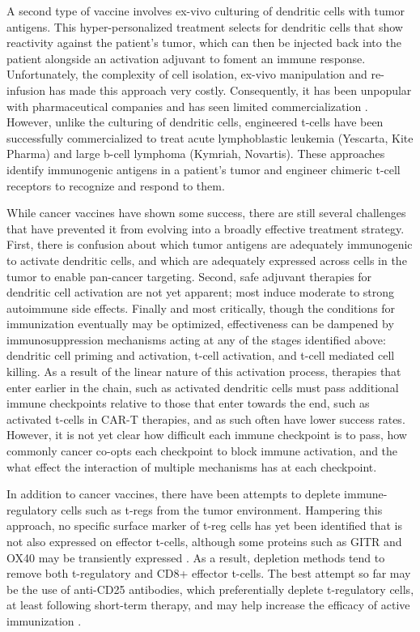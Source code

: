 A second type of vaccine involves ex-vivo culturing of dendritic cells with tumor antigens. 
This hyper-personalized treatment selects for dendritic cells that show reactivity against the patient’s tumor, which can then be injected back into the patient alongside an activation adjuvant to foment an immune response. 
Unfortunately, the complexity of cell isolation, ex-vivo manipulation and re-infusion has made this approach very costly. 
Consequently, it has been unpopular with pharmaceutical companies and has seen limited commercialization \citep{Mellman2011}.
However, unlike the culturing of dendritic cells, engineered t-cells have been successfully commercialized to treat acute lymphoblastic leukemia (Yescarta, Kite Pharma) and large b-cell lymphoma (Kymriah, Novartis).
These approaches identify immunogenic antigens in a patient’s tumor and engineer chimeric t-cell receptors to recognize and respond to them.  

While cancer vaccines have shown some success, there are still several challenges that have prevented it from evolving into a broadly effective treatment strategy. 
First, there is confusion about which tumor antigens are adequately immunogenic to activate dendritic cells, and which are adequately expressed across cells in the tumor to enable pan-cancer targeting.
Second, safe adjuvant therapies for dendritic cell activation are not yet apparent; most induce moderate to strong autoimmune side effects. 
Finally and most critically, though the conditions for immunization eventually may be optimized, effectiveness can be dampened by immunosuppression mechanisms acting at any of the stages identified above: dendritic cell priming and activation, t-cell activation, and t-cell mediated cell killing.
As a result of the linear nature of this activation process, therapies that enter earlier in the chain, such as activated dendritic cells must pass additional immune checkpoints relative to those that enter towards the end, such as activated t-cells in CAR-T therapies, and as such often have lower success rates. 
However, it is not yet clear how difficult each immune checkpoint is to pass, how commonly cancer co-opts each checkpoint to block immune activation, and the what effect the interaction of multiple mechanisms has at each checkpoint.

In addition to cancer vaccines, there have been attempts to deplete immune-regulatory cells such as t-regs from the tumor environment. 
Hampering this approach, no specific surface marker of t-reg cells has yet been identified that is not also expressed on effector t-cells, although some proteins such as GITR and OX40 may be transiently expressed \citep{Ito2006,Cohen2010}.
As a result, depletion methods tend to remove both t-regulatory and CD8+ effector t-cells. 
The best attempt so far may be the use of anti-CD25 antibodies, which preferentially deplete t-regulatory cells, at least following short-term therapy, and may help increase the efficacy of active immunization \citep{Golovina2010}. 

